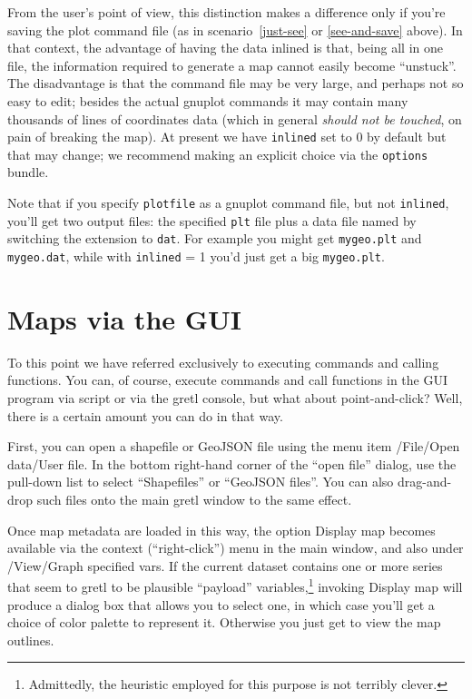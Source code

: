 \documentclass{article}
\begin{document}
From the user's point of view, this distinction makes a difference
only if you're saving the plot command file (as in
scenario~\ref{just-see} or \ref{see-and-save} above).  In that
context, the advantage of having the data inlined is that, being all
in one file, the information required to generate a map cannot easily
become ``unstuck''. The disadvantage is that the command file may be
very large, and perhaps not so easy to edit; besides the actual
\textsf{gnuplot} commands it may contain many thousands of lines of
coordinates data (which in general \textit{should not be touched}, on
pain of breaking the map). At present we have \texttt{inlined} set to
0 by default but that may change; we recommend making an explicit
choice via the \texttt{options} bundle.

Note that if you specify \texttt{plotfile} as a \textsf{gnuplot}
command file, but not \texttt{inlined}, you'll get two output files:
the specified \texttt{plt} file plus a data file named by switching
the extension to \texttt{dat}. For example you might get
\texttt{mygeo.plt} and \texttt{mygeo.dat}, while with \texttt{inlined}
= 1 you'd just get a big \texttt{mygeo.plt}.

\section{Maps via the GUI}
\label{sec:gui}

To this point we have referred exclusively to executing commands and
calling functions. You can, of course, execute commands and call
functions in the GUI program via script or via the gretl console, but
what about point-and-click? Well, there is a certain amount you can do
in that way.

First, you can open a shapefile or GeoJSON file using the menu item
\textsf{/File/Open data/User file}. In the bottom right-hand corner of
the ``open file'' dialog, use the pull-down list to select
``Shapefiles'' or ``GeoJSON files''. You can also drag-and-drop such
files onto the main gretl window to the same effect.

Once map metadata are loaded in this way, the option \textsf{Display
  map} becomes available via the context (``right-click'') menu in the
main window, and also under \textsf{/View/Graph specified vars}. If
the current dataset contains one or more series that seem to gretl to
be plausible ``payload'' variables,\footnote{Admittedly, the heuristic
  employed for this purpose is not terribly clever.} invoking
\textsf{Display map} will produce a dialog box that allows you to
select one, in which case you'll get a choice of color palette to
represent it. Otherwise you just get to view the map outlines.
\end{document}
